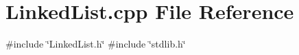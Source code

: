 \section{Linked\+List.\+cpp File Reference}
\label{LinkedList_8cpp}
{\ttfamily \#include \char`\"{}Linked\+List.\+h\char`\"{}}\newline
{\ttfamily \#include \char`\"{}stdlib.\+h\char`\"{}}\newline
